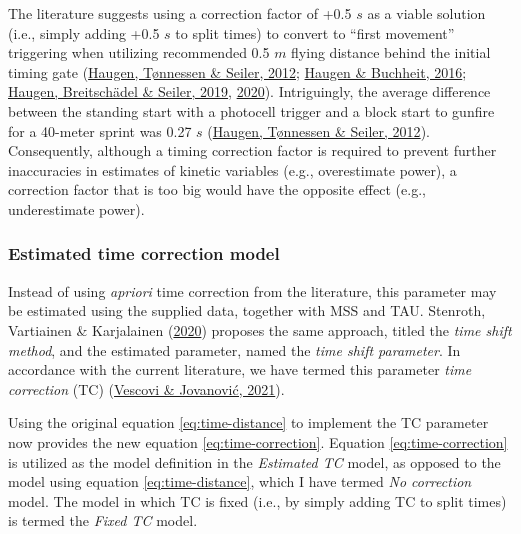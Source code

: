 \documentclass[fleqn,10pt]{wlpeerj} %
\begin{document}
The literature suggests using a correction factor of +0.5 \(s\) as a viable solution (i.e., simply adding +0.5 \(s\) to split times) to convert to ``first movement'' triggering when utilizing recommended 0.5 \(m\) flying distance behind the initial timing gate (\protect\hyperlink{ref-haugenDifferenceStartImpact2012}{Haugen, Tønnessen \& Seiler, 2012}; \protect\hyperlink{ref-haugenSprintRunningPerformance2016}{Haugen \& Buchheit, 2016}; \protect\hyperlink{ref-haugenSprintMechanicalVariables2019}{Haugen, Breitschädel \& Seiler, 2019}, \protect\hyperlink{ref-haugenSprintMechanicalProperties2020}{2020}). Intriguingly, the average difference between the standing start with a photocell trigger and a block start to gunfire for a 40-meter sprint was 0.27 \(s\) (\protect\hyperlink{ref-haugenDifferenceStartImpact2012}{Haugen, Tønnessen \& Seiler, 2012}). Consequently, although a timing correction factor is required to prevent further inaccuracies in estimates of kinetic variables (e.g., overestimate power), a correction factor that is too big would have the opposite effect (e.g., underestimate power).

\hypertarget{estimated-time-correction-model}{%
\subsubsection{Estimated time correction model}\label{estimated-time-correction-model}}

Instead of using \emph{apriori} time correction from the literature, this parameter may be estimated using the supplied data, together with MSS and TAU. Stenroth, Vartiainen \& Karjalainen (\protect\hyperlink{ref-stenrothForcevelocityProfilingIce2020}{2020}) proposes the same approach, titled the \emph{time shift method}, and the estimated parameter, named the \emph{time shift parameter}. In accordance with the current literature, we have termed this parameter \emph{time correction} (TC) (\protect\hyperlink{ref-vescoviSprintMechanicalCharacteristics2021}{Vescovi \& Jovanović, 2021}).

Using the original equation \eqref{eq:time-distance} to implement the TC parameter now provides the new equation \eqref{eq:time-correction}. Equation \eqref{eq:time-correction} is utilized as the model definition in the \emph{Estimated TC} model, as opposed to the model using equation \eqref{eq:time-distance}, which I have termed \emph{No correction} model. The model in which TC is fixed (i.e., by simply adding TC to split times) is termed the \emph{Fixed TC} model.
\end{document}
